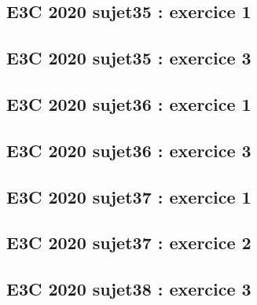 \documentclass[lang=fr,edition=teacher,layout=sheet]{mxbook}
\begin{document}
\begingroup\endgroup
\par\bigskip
{}\subsection*{E3C 2020 sujet35 : exercice 1}
\begingroup\endgroup
\par\bigskip
{}\subsection*{E3C 2020 sujet35 : exercice 3}
\begingroup\endgroup
\par\bigskip
{}\subsection*{E3C 2020 sujet36 : exercice 1}
\begingroup\endgroup
\par\bigskip
{}\subsection*{E3C 2020 sujet36 : exercice 3}
\begingroup\endgroup
\par\bigskip
{}\subsection*{E3C 2020 sujet37 : exercice 1}
\begingroup\endgroup
\par\bigskip
{}\subsection*{E3C 2020 sujet37 : exercice 2}
\begingroup\endgroup
\par\bigskip
{}\subsection*{E3C 2020 sujet38 : exercice 3}
\begingroup\endgroup
\end{document}
